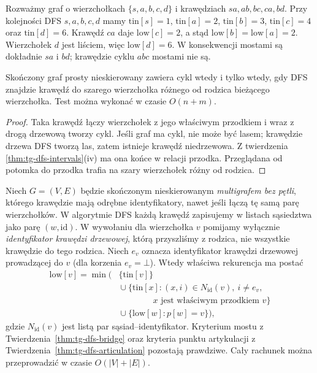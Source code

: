 \begin{przyklad}
\label{ex:tg-dfs-low}
Rozważmy graf o wierzchołkach $\{s,a,b,c,d\}$
i krawędziach $sa,ab,bc,ca,bd$.
Przy kolejności DFS $s,a,b,c,d$ mamy
$\mathrm{tin}[s]=1$, $\mathrm{tin}[a]=2$,
$\mathrm{tin}[b]=3$, $\mathrm{tin}[c]=4$
oraz $\mathrm{tin}[d]=6$.
Krawędź $ca$ daje
$\mathrm{low}[c]=2$, a stąd
$\mathrm{low}[b]=\mathrm{low}[a]=2$.
Wierzchołek $d$ jest liściem, więc
$\mathrm{low}[d]=6$.
W konsekwencji mostami są dokładnie
$sa$ i $bd$; krawędzie cyklu $abc$ mostami
nie są.
\end{przyklad}

\begin{stwierdzenie}
\label{prop:tg-dfs-cycle}
Skończony graf prosty nieskierowany zawiera
cykl wtedy i tylko wtedy, gdy DFS znajdzie
krawędź do szarego wierzchołka różnego
od rodzica bieżącego wierzchołka.
Test można wykonać w czasie $O(n+m)$.
\end{stwierdzenie}
\begin{proof}
Taka krawędź łączy wierzchołek z jego
właściwym przodkiem i wraz z drogą
drzewową tworzy cykl. Jeśli graf ma cykl,
nie może być lasem; krawędzie drzewa DFS
tworzą las, zatem istnieje krawędź
niedrzewowa. Z twierdzenia
\ref{thm:tg-dfs-intervals}(iv) ma ona
końce w relacji przodka. Przeglądana
od potomka do przodka trafia na szary
wierzchołek różny od rodzica.
\end{proof}

\begin{stwierdzenie}
\label{prop:tg-dfs-multigraph-edges}
Niech $G=(V,E)$ będzie skończonym nieskierowanym
\emph{multigrafem bez pętli}, którego krawędzie
mają odrębne identyfikatory, nawet jeśli łączą
tę samą parę wierzchołków. W algorytmie DFS
każdą krawędź zapisujemy w listach sąsiedztwa
jako parę $(w,\mathrm{id})$. W wywołaniu dla
wierzchołka $v$ pomijamy wyłącznie
\emph{identyfikator krawędzi drzewowej},
którą przyszliśmy z rodzica, nie wszystkie
krawędzie do tego rodzica.
Niech $e_v$ oznacza identyfikator krawędzi drzewowej
prowadzącej do $v$ (dla korzenia $e_v=\bot$).
Wtedy właściwa rekurencja ma postać
\[
\begin{aligned}
\mathrm{low}[v]=\min\bigl(
 &\{\mathrm{tin}[v]\}\\
 &{}\cup\{\mathrm{tin}[x]:(x,i)\in N_{\mathrm{id}}(v),\ i\ne e_v,\\
 &\qquad\qquad x\text{ jest właściwym przodkiem }v\}\\
 &{}\cup\{\mathrm{low}[w]:p[w]=v\}\bigr),
\end{aligned}
\]
gdzie $N_{\mathrm{id}}(v)$ jest listą par sąsiad--identyfikator.
Kryterium mostu
z Twierdzenia~\ref{thm:tg-dfs-bridge}
oraz kryteria punktu artykulacji
z Twierdzenia~\ref{thm:tg-dfs-articulation}
pozostają prawdziwe.
Cały rachunek można przeprowadzić
w czasie $O(|V|+|E|)$.
\end{stwierdzenie}

